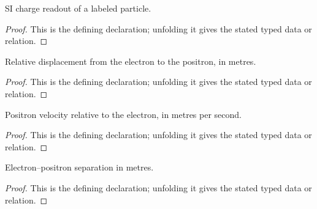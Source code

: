 \begin{definition}[particleChargeSI]
  \label{decl:physics:IPhO_2026_1_B_2:particleChargeSI}
  SI charge readout of a labeled particle.
\end{definition}
\begin{proof}
  This is the defining declaration; unfolding it gives the stated typed data or relation.
\end{proof}

\begin{definition}[relativeDisplacementSI]
  \label{decl:physics:IPhO_2026_1_B_2:relativeDisplacementSI}
  Relative displacement from the electron to the positron, in metres.
\end{definition}
\begin{proof}
  This is the defining declaration; unfolding it gives the stated typed data or relation.
\end{proof}

\begin{definition}[relativeVelocitySI]
  \label{decl:physics:IPhO_2026_1_B_2:relativeVelocitySI}
  Positron velocity relative to the electron, in metres per second.
\end{definition}
\begin{proof}
  This is the defining declaration; unfolding it gives the stated typed data or relation.
\end{proof}

\begin{definition}[separationSI]
  \label{decl:physics:IPhO_2026_1_B_2:separationSI}
  Electron--positron separation in metres.
\end{definition}
\begin{proof}
  This is the defining declaration; unfolding it gives the stated typed data or relation.
\end{proof}

